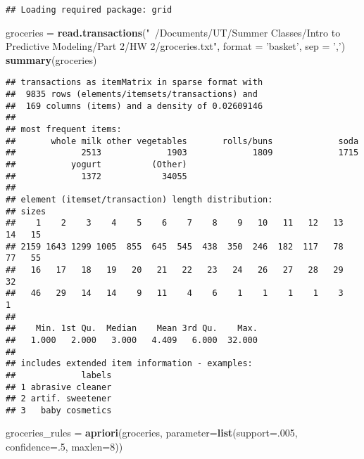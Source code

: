 \documentclass[]{article}
\newenvironment{Shaded}{\begin{snugshade}}{\end{snugshade}}
\newcommand{\KeywordTok}[1]{\textcolor[rgb]{0.13,0.29,0.53}{\textbf{#1}}}
\newcommand{\DataTypeTok}[1]{\textcolor[rgb]{0.13,0.29,0.53}{#1}}
\newcommand{\DecValTok}[1]{\textcolor[rgb]{0.00,0.00,0.81}{#1}}
\newcommand{\StringTok}[1]{\textcolor[rgb]{0.31,0.60,0.02}{#1}}
\newcommand{\NormalTok}[1]{#1}
\begin{document}
\begin{verbatim}
## Loading required package: grid
\end{verbatim}

\begin{Shaded}
\begin{Highlighting}[]
\NormalTok{groceries =}\StringTok{ }\KeywordTok{read.transactions}\NormalTok{(}\StringTok{"~/Documents/UT/Summer Classes/Intro to Predictive Modeling/Part 2/HW 2/groceries.txt"}\NormalTok{, }\DataTypeTok{format =} \StringTok{'basket'}\NormalTok{, }\DataTypeTok{sep =} \StringTok{','}\NormalTok{)}
\KeywordTok{summary}\NormalTok{(groceries)}
\end{Highlighting}
\end{Shaded}

\begin{verbatim}
## transactions as itemMatrix in sparse format with
##  9835 rows (elements/itemsets/transactions) and
##  169 columns (items) and a density of 0.02609146 
## 
## most frequent items:
##       whole milk other vegetables       rolls/buns             soda 
##             2513             1903             1809             1715 
##           yogurt          (Other) 
##             1372            34055 
## 
## element (itemset/transaction) length distribution:
## sizes
##    1    2    3    4    5    6    7    8    9   10   11   12   13   14   15 
## 2159 1643 1299 1005  855  645  545  438  350  246  182  117   78   77   55 
##   16   17   18   19   20   21   22   23   24   26   27   28   29   32 
##   46   29   14   14    9   11    4    6    1    1    1    1    3    1 
## 
##    Min. 1st Qu.  Median    Mean 3rd Qu.    Max. 
##   1.000   2.000   3.000   4.409   6.000  32.000 
## 
## includes extended item information - examples:
##             labels
## 1 abrasive cleaner
## 2 artif. sweetener
## 3   baby cosmetics
\end{verbatim}

\begin{Shaded}
\begin{Highlighting}[]
\NormalTok{groceries_rules =}\StringTok{ }\KeywordTok{apriori}\NormalTok{(groceries, }\DataTypeTok{parameter=}\KeywordTok{list}\NormalTok{(}\DataTypeTok{support=}\NormalTok{.}\DecValTok{005}\NormalTok{, }\DataTypeTok{confidence=}\NormalTok{.}\DecValTok{5}\NormalTok{, }\DataTypeTok{maxlen=}\DecValTok{8}\NormalTok{))}
\end{Highlighting}
\end{Shaded}
\end{document}
